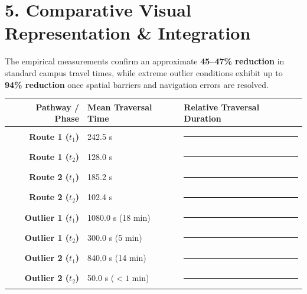 \documentclass[11pt, a4paper]{article}
\begin{document}
\vspace{1em}


\section*{5. Comparative Visual Representation \& Integration}

The empirical measurements confirm an approximate \textbf{45--47\% reduction} in standard campus travel times, while extreme outlier conditions exhibit up to \textbf{94\% reduction} once spatial barriers and navigation errors are resolved.

\vspace{0.8em}

\begin{center}
\small
\begin{tabular}{r l l}
\toprule
\textbf{Pathway / Phase} & \textbf{Mean Traversal Time} & \textbf{Relative Traversal Duration} \\
\midrule
\textbf{Route 1 ($t_1$)} & 242.5 s & \textcolor{primary}{\rule{5.0cm}{8pt}} \\
\textbf{Route 1 ($t_2$)} & 128.0 s & \textcolor{secondary}{\rule{2.6cm}{8pt}} \\[0.4em]
\textbf{Route 2 ($t_1$)} & 185.2 s & \textcolor{primary}{\rule{3.8cm}{8pt}} \\
\textbf{Route 2 ($t_2$)} & 102.4 s & \textcolor{secondary}{\rule{2.1cm}{8pt}} \\[0.4em]
\textbf{Outlier 1 ($t_1$)} & 1080.0 s (18 min) & \textcolor{accent}{\rule{11.5cm}{8pt}} \\
\textbf{Outlier 1 ($t_2$)} & 300.0 s (5 min) & \textcolor{secondary}{\rule{3.2cm}{8pt}} \\[0.4em]
\textbf{Outlier 2 ($t_1$)} & 840.0 s (14 min) & \textcolor{accent}{\rule{9.0cm}{8pt}} \\
\textbf{Outlier 2 ($t_2$)} & 50.0 s ($<1$ min) & \textcolor{secondary}{\rule{0.6cm}{8pt}} \\
\bottomrule
\end{tabular}
\end{center}

\vspace{1.5em}
\end{document}
